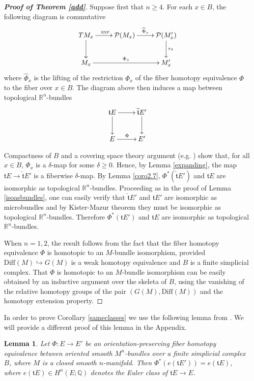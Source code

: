 \documentclass[onecolumn,notitlepage,11pt]{article}
\newcommand{\p}{\mathcal{P}}
\newcommand{\Q}{\mathbb{Q}}
\newcommand{\R}{\mathbb{R}}
\newcommand{\Diff}{\mbox{Diff}}
\newcommand{\beq}{\begin{equation*}}
\newcommand{\eeq}{\end{equation*}}
\newtheorem{lemma}{Lemma}[section]
\theoremstyle{definition}
\begin{document}
\begin{proof}[\textbf{Proof of Theorem \ref{add}}]
Suppose first that $n\geq 4$.
For each $x\in B$, the following diagram is commutative
\beq
\xymatrix{
TM_x\ar[d]\ar[r]^{\textsc{exp}}&\p
(M_x)\ar[r]^{\widehat{\Phi}_x}&\p
(M'_x)\ar[d]^{r_0}\\
M_x\ar[rr]^{\Phi_x}&&M'_x
}
\eeq
where $\widehat{\Phi}_x$ is the lifting of the restriction $\Phi_x$
of the fiber homotopy equivalence $\Phi$ to the fiber over $x\in B$. 
The diagram above then induces
a map between topological $\R^n$-bundles
\beq
\xymatrix{
\mathfrak{t}E\ar[d]\ar[r]&\widehat{\mathfrak{t}}E'\ar[d]\\
E\ar[r]^{\Phi} & E'
}
\eeq

Compactness of $B$ and a covering space theory argument 
(e.g. \cite[p. 409]{FW91}) show that, for all $x\in B$,
$\Phi_x$ is a $\delta$-map for some $\delta\geq 0$. Hence, by
Lemma \ref{expanding}, the map
$\mathfrak{t}E\to\widehat{\mathfrak{t}}E'$ is a fiberwise $\delta$-map.
By Lemma \ref{coro2.7},
$\Phi^*(\widehat{\mathfrak{t}}E')$ and $\mathfrak{t}E$ are isomorphic
as topological $\R^n$-bundles.
Proceeding as in the proof of Lemma
\ref{isoasbundles}, one can easily verify that 
$\widehat{\mathfrak{t}}E'$ and $\mathfrak{t}E'$ are isomorphic as
microbundles and by Kister-Mazur theorem they must be isomorphic as
topological $\R^n$-bundles. Therefore $\Phi^*(\mathfrak{t}E')$ and $\mathfrak{t}E$
are isomorphic as topological $\R^n$-bundles.

When $n=1,2$, the result follows from the fact that the fiber
homotopy equivalence $\Phi$ is homotopic to an $M$-bundle isomorphism,
provided $\Diff(M)\hookrightarrow G(M)$ is a weak homotopy equivalence
and $B$ is a finite simplicial complex. That
$\Phi$ is homotopic to an $M$-bundle isomorphism
can be easily obtained
by an inductive argument over the 
skeleta of $B$, using the vanishing
of the relative homotopy groups of the pair $(G(M),\Diff(M))$ and the
homotopy extension property.
\end{proof}
In order to prove Corollary \ref{sameclasses}
 we use the following lemma
from \cite[Theorem 5.6]{GGRW}. We will provide a different proof
of this lemma in the Appendix. 
\begin{lemma}\label{app2}
Let $\Phi:E\to E'$ be an orientation-preserving 
fiber homotopy equivalence between
oriented smooth $M^n$-bundles
over a finite simplicial complex $B$,
where $M$ is a closed smooth $n$-manifold. Then 
$\Phi^*(e(\mathfrak{t}E'))=e(\mathfrak{t}E)$, where 
$e(\mathfrak{t}E)\in H^{n}(E;\Q)$
denotes the Euler class of $\mathfrak{t}E\to E$.
\end{lemma}
\end{document}
